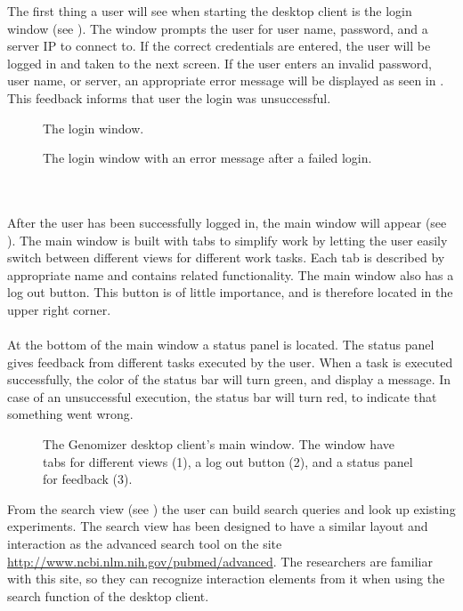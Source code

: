 The first thing a user will see when starting the desktop client is the login window (see ). The window prompts the user for user name, password, and a server IP to connect to. If the correct credentials are entered, the user will be logged in and taken to the next screen. If the user enters an invalid password, user name, or server, an appropriate error message will be displayed as seen in . This feedback informs that user the login was unsuccessful.
\begin{figure}[h]
	\caption{\footnotesize The login window.}
	\label{fig:des_login_window}
\end{figure}
\begin{figure}[h!]
	\caption{\footnotesize The login window with an error message after a failed login.}
	\label{fig:des_login_failed}
\end{figure}
\\\\
After the user has been successfully logged in, the main window will appear (see ). The main window  is built with tabs to simplify work by letting the user easily switch between different views for different work tasks. Each tab is described by appropriate name and contains related functionality. The main window also has a log out button. This button is of little importance, and is therefore located in the upper right corner.
\\\\
At the bottom of the main window a status panel is located. The status panel gives feedback from different tasks executed by the user. When a task is executed successfully, the color of the status bar will turn green, and display a message. In case of an unsuccessful execution, the status bar will turn red, to indicate that something went wrong.
\begin{figure}[h]
	\caption{\footnotesize The Genomizer desktop client's main window. The window have tabs for different views (1), a log out button (2), and a status panel for feedback (3).}
	\label{fig:des_main_window}
\end{figure}

From the search view (see ) the user can build search queries and look up existing experiments. The search view has been designed to have a similar layout and interaction as the advanced search tool on the site \url{http://www.ncbi.nlm.nih.gov/pubmed/advanced}. The researchers are familiar with this site, so they can recognize interaction elements from it when using the search function of the desktop client.


